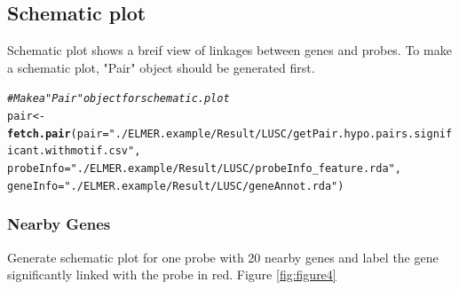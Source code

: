 \documentclass{article}\usepackage[]{graphicx}\usepackage[usenames,dvipsnames]{color}
\makeatletter
\newcommand{\hlstr}[1]{\textcolor[rgb]{0.192,0.494,0.8}{#1}}%
\newcommand{\hlcom}[1]{\textcolor[rgb]{0.678,0.584,0.686}{\textit{#1}}}%
\newcommand{\hlstd}[1]{\textcolor[rgb]{0.345,0.345,0.345}{#1}}%
\newcommand{\hlkwb}[1]{\textcolor[rgb]{0.69,0.353,0.396}{#1}}%
\newcommand{\hlkwc}[1]{\textcolor[rgb]{0.333,0.667,0.333}{#1}}%
\newcommand{\hlkwd}[1]{\textcolor[rgb]{0.737,0.353,0.396}{\textbf{#1}}}%
\newenvironment{kframe}{%
 \def\at@end@of@kframe{}%
 \ifinner\ifhmode%
  \def\at@end@of@kframe{\end{minipage}}%
  \begin{minipage}{\columnwidth}%
 \fi\fi%
 \def\FrameCommand##1{\hskip\@totalleftmargin \hskip-\fboxsep
 \colorbox{shadecolor}{##1}\hskip-\fboxsep
     \hskip-\linewidth \hskip-\@totalleftmargin \hskip\columnwidth}%
 \MakeFramed {\advance\hsize-\width
   \@totalleftmargin\z@ \linewidth\hsize
   \@setminipage}}%
 {\par\unskip\endMakeFramed%
 \at@end@of@kframe}
\newenvironment{knitrout}{}{} %
\makeatother
\begin{document}
\subsection{Schematic plot}
Schematic plot shows a breif view of linkages between genes and probes. To make a 
schematic plot, "Pair" object should be generated first.
\begin{knitrout}
\color{fgcolor}\begin{kframe}
\begin{alltt}
\hlcom{# Make a "Pair" object for schematic.plot}
\hlstd{pair} \hlkwb{<-} \hlkwd{fetch.pair}\hlstd{(}\hlkwc{pair}\hlstd{=}\hlstr{"./ELMER.example/Result/LUSC/getPair.hypo.pairs.significant.withmotif.csv"}\hlstd{,}
                   \hlkwc{probeInfo} \hlstd{=} \hlstr{"./ELMER.example/Result/LUSC/probeInfo_feature.rda"}\hlstd{,}
                   \hlkwc{geneInfo} \hlstd{=} \hlstr{"./ELMER.example/Result/LUSC/geneAnnot.rda"}\hlstd{)}
\end{alltt}


{\ttfamily\noindent\itshape{}}\end{kframe}
\end{knitrout}
\newpage
\subsubsection{Nearby Genes}
Generate schematic plot for one probe with 20 nearby genes and label 
the gene significantly linked with the probe in red. Figure \ref{fig:figure4}
\end{document}

